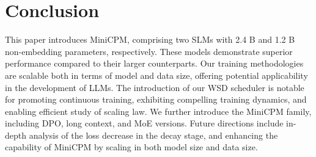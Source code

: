 
\vspace{-3mm}
\section{Conclusion}

This paper introduces MiniCPM, comprising two SLMs with 2.4 B and 1.2 B non-embedding parameters, respectively. These models demonstrate superior performance compared to their larger counterparts. Our training methodologies are scalable both in terms of model and data size, offering potential applicability in the development of LLMs. The introduction of our WSD scheduler is notable for promoting continuous training,  exhibiting compelling training dynamics, and enabling efficient study of scaling law. We further introduce the MiniCPM family, including DPO, long context, and MoE versions. Future directions include in-depth analysis of the loss decrease in the decay stage, and enhancing the capability of MiniCPM by scaling in both model size and data size.

